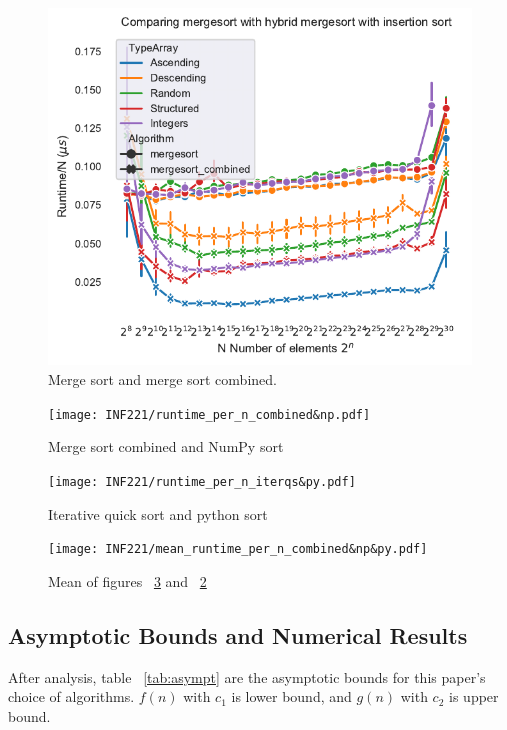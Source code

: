 \documentclass[sigconf, nonacm, natbib, screen, balance=False]{acmart}
\begin{document}
\begin{figure}[]
  \centering
  \includegraphics[scale=0.9]{runtime_per_n_merge&combined.pdf}
  \caption{Merge sort and merge sort combined.}
  \label{fig:merge_mergecomb}
\end{figure}

\begin{figure}[]
  \centering
  \texttt{[image: INF221/runtime\_per\_n\_combined\&np.pdf]}
  \caption{Merge sort combined and NumPy sort}
  \label{fig:msc_np}
\end{figure}

\begin{figure}[]
  \centering
  \texttt{[image: INF221/runtime\_per\_n\_iterqs\&py.pdf]}
  \caption{Iterative quick sort and python sort}
  \label{fig:iqs_ps}
\end{figure}

\begin{figure}[]
  \centering
  \texttt{[image: INF221/mean\_runtime\_per\_n\_combined\&np\&py.pdf]}
  \caption{Mean of figures ~\ref{fig:iqs_ps} and ~\ref{fig:msc_np}}
  \label{fig:mean_np_py_mergecomb}
\end{figure}

\subsection{Asymptotic Bounds and Numerical Results}\label{sec:results_comp}
After analysis, table ~\ref{tab:asympt} are the asymptotic bounds for this paper's choice of algorithms. $f(n)$ with $c_1$ is lower bound, and $g(n)$ with $c_2$ is upper bound. 
\end{document}
